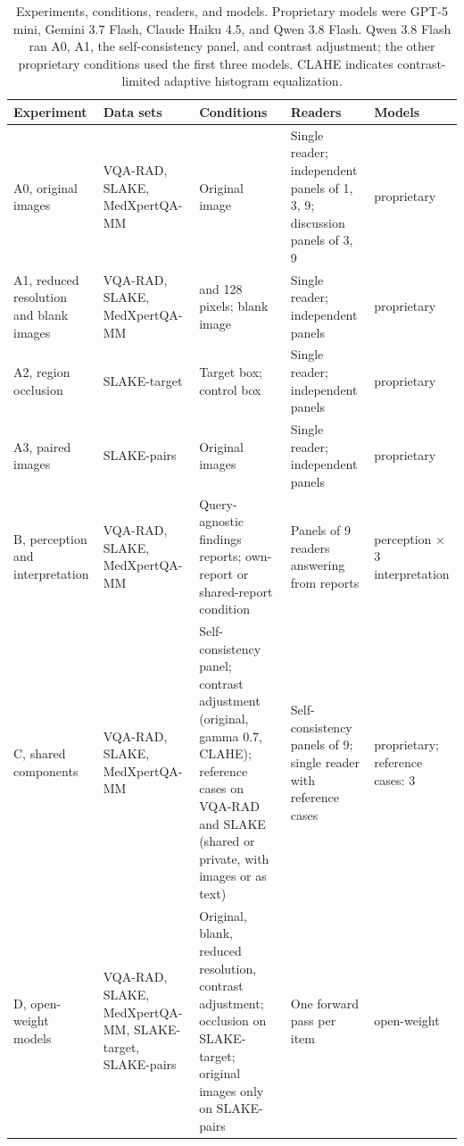 \begin{table}[!htbp]
\centering
\caption{Experiments, conditions, readers, and models. Proprietary models were GPT-5 mini, Gemini 3.7 Flash, Claude Haiku 4.5, and Qwen 3.8 Flash. Qwen 3.8 Flash ran A0, A1, the self-consistency panel, and contrast adjustment; the other proprietary conditions used the first three models. CLAHE indicates contrast-limited adaptive histogram equalization.}
\label{tab:design}
\footnotesize
\setlength{\tabcolsep}{3pt}
\begin{tabular}{@{}>{\raggedright\arraybackslash}p{}>{\raggedright\arraybackslash}p{}>{\raggedright\arraybackslash}p{}>{\raggedright\arraybackslash}p{}>{\raggedright\arraybackslash}p{}@{}}
\toprule
Experiment & Data sets & Conditions & Readers & Models \\
\midrule
A0, original images & VQA-RAD, SLAKE, MedXpertQA-MM & Original image & Single reader; independent panels of 1, 3, 9; discussion panels of 3, 9 & 4 proprietary \\
A1, reduced resolution and blank images & VQA-RAD, SLAKE, MedXpertQA-MM & 256 and 128 pixels; blank image & Single reader; independent panels & 4 proprietary \\
A2, region occlusion & SLAKE-target & Target box; control box & Single reader; independent panels & 3 proprietary \\
A3, paired images & SLAKE-pairs & Original images & Single reader; independent panels & 3 proprietary \\
B, perception and interpretation & VQA-RAD, SLAKE, MedXpertQA-MM & Query-agnostic findings reports; own-report or shared-report condition & Panels of 9 readers answering from reports & 3 perception $\times$ 3 interpretation \\
C, shared components & VQA-RAD, SLAKE, MedXpertQA-MM & Self-consistency panel; contrast adjustment (original, gamma 0.7, CLAHE); reference cases on VQA-RAD and SLAKE (shared or private, with images or as text) & Self-consistency panels of 9; single reader with reference cases & 4 proprietary; reference cases: 3 \\
D, open-weight models & VQA-RAD, SLAKE, MedXpertQA-MM, SLAKE-target, SLAKE-pairs & Original, blank, reduced resolution, contrast adjustment; occlusion on SLAKE-target; original images only on SLAKE-pairs & One forward pass per item & 5 open-weight \\
\bottomrule
\end{tabular}
\end{table}

